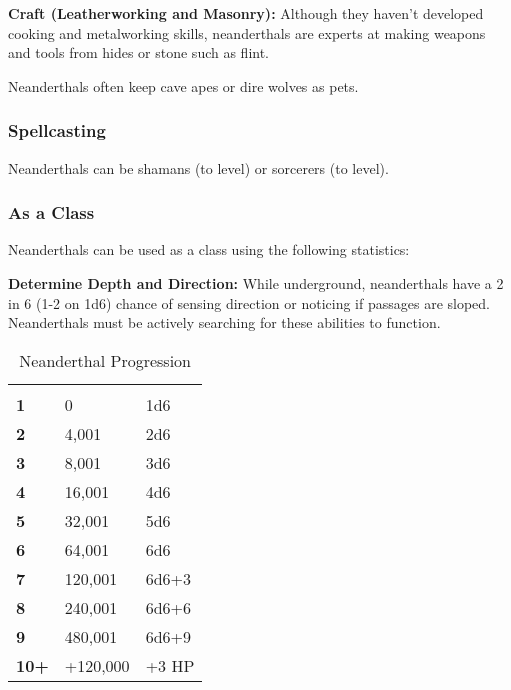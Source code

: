\begin{multicols*}{2}
\textbf{Craft (Leatherworking and Masonry):} Although they haven't developed cooking and metalworking skills, neanderthals are experts at making weapons and tools from hides or stone such as flint.

Neanderthals often keep cave apes or dire wolves as pets.

\subsubsection{Spellcasting}
Neanderthals can be shamans (to  level) or sorcerers (to  level).

\subsubsection{As a Class}
Neanderthals can be used as a class using the following statistics:

\textbf{Determine Depth and Direction:} While underground, neanderthals have a 2 in 6 (1-2 on 1d6) chance of sensing direction or noticing if passages are sloped. Neanderthals must be actively searching for these abilities to function.


\begin {table}[H]
  \caption{Neanderthal Progression}
  \begin{tabularx}{\columnwidth}{>{\bfseries}YYY}
   &  & \\
	1 & 0 & 1d6\\
	2 & 4,001 & 2d6\\
	3 & 8,001 & 3d6\\
	4 & 16,001 & 4d6\\
	5 & 32,001 & 5d6\\
	6 & 64,001 & 6d6\\
	7 & 120,001 & 6d6+3\\
	8 & 240,001 & 6d6+6\\
	9 & 480,001 & 6d6+9\\
	10+ & +120,000 & +3 HP
  \end {tabularx}
\end {table}


\end{multicols*}
